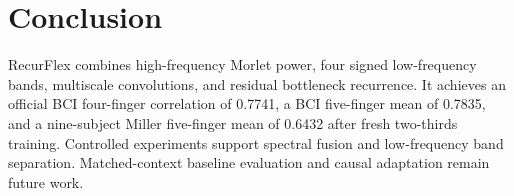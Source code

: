 \section{Conclusion}
RecurFlex combines high-frequency Morlet power, four signed low-frequency bands, multiscale convolutions, and residual bottleneck recurrence. It achieves an official BCI four-finger correlation of 0.7741, a BCI five-finger mean of 0.7835, and a nine-subject Miller five-finger mean of 0.6432 after fresh two-thirds training. Controlled experiments support spectral fusion and low-frequency band separation. Matched-context baseline evaluation and causal adaptation remain future work.
